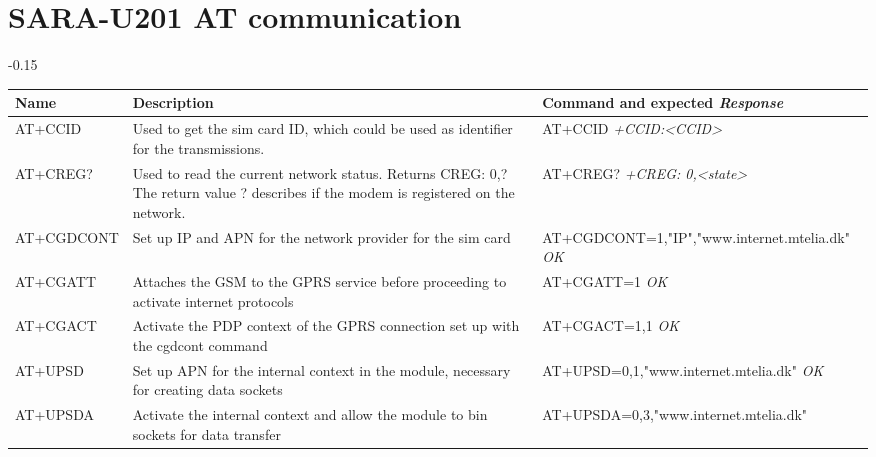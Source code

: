 \appendix
\setlength{\beforechapskip}{-15ex}

\chapter{SARA-U201 AT communication}
\label{app:sarau201}
\begin{table}[H]
	\addtolength{\leftskip} {-0.15\textwidth}
	\addtolength{\rightskip}{-0.15\textwidth}
	\begin{tabularx}{1.3\textwidth}{p{2cm} X X}
		\toprule
		Name & Description & Command and expected \textit{Response} \\
		\midrule
		AT+CCID & Used to get the sim card ID, which could be used as identifier for the transmissions. & AT+CCID \newline \newline
		\textit{+CCID:<CCID>} \\ 
		AT+CREG? & Used to read the current network status. Returns CREG: 0,? \newline
		The return value ? describes if the modem is registered on the network. & AT+CREG? \newline \newline
		\textit{+CREG: 0,<state>} \\
		AT+CGDCONT & Set up IP and APN for the network provider for the sim card & AT+CGDCONT=1,"IP","www.internet.mtelia.dk" \newline \newline
		\textit{OK} \\
		AT+CGATT & Attaches the GSM to the GPRS service before proceeding to activate internet protocols & AT+CGATT=1 \newline \newline
		\textit{OK} \\
		AT+CGACT & Activate the PDP context of the GPRS connection set up with the cgdcont command & AT+CGACT=1,1 \newline \newline
		\textit{OK} \\
		AT+UPSD & Set up APN for the internal context in the module, necessary for creating data sockets& AT+UPSD=0,1,"www.internet.mtelia.dk" \newline \newline
		\textit{OK} \\
		AT+UPSDA & Activate the internal context and allow the module to bin sockets for data transfer & AT+UPSDA=0,3,"www.internet.mtelia.dk"\newline \newline

\end{tabularx}
\end{table}
